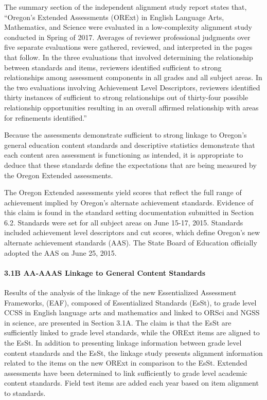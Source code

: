 \documentclass[]{article}
\let\oldparagraph\paragraph
\renewcommand{\paragraph}[1]{\oldparagraph{#1}\mbox{}}
\begin{document}
The summary section of the independent alignment study report states
that, ``Oregon's Extended Assessments (ORExt) in English Language Arts,
Mathematics, and Science were evaluated in a low-complexity alignment
study conducted in Spring of 2017. Averages of reviewer professional
judgments over five separate evaluations were gathered, reviewed, and
interpreted in the pages that follow. In the three evaluations that
involved determining the relationship between standards and items,
reviewers identified sufficient to strong relationships among assessment
components in all grades and all subject areas. In the two evaluations
involving Achievement Level Descriptors, reviewers identified thirty
instances of sufficient to strong relationships out of thirty-four
possible relationship opportunities resulting in an overall affirmed
relationship with areas for refinements identified.''

Because the assessments demonstrate sufficient to strong linkage to
Oregon's general education content standards and descriptive statistics
demonstrate that each content area assessment is functioning as
intended, it is appropriate to deduce that these standards define the
expectations that are being measured by the Oregon Extended assessments.

The Oregon Extended assessments yield scores that reflect the full range
of achievement implied by Oregon's alternate achievement standards.
Evidence of this claim is found in the standard setting documentation
submitted in Section 6.2. Standards were set for all subject areas on
June 15-17, 2015. Standards included achievement level descriptors and
cut scores, which define Oregon's new alternate achievement standards
(AAS). The State Board of Education officially adopted the AAS on June
25, 2015.

\hypertarget{b-aa-aaas-linkage-to-general-content-standards}{%
\paragraph{3.1B AA-AAAS Linkage to General Content
Standards}\label{b-aa-aaas-linkage-to-general-content-standards}}

Results of the analysis of the linkage of the new Essentialized
Assessment Frameworks, (EAF), composed of Essentialized Standards
(EsSt), to grade level CCSS in English language arts and mathematics and
linked to ORSci and NGSS in science, are presented in Section 3.1A. The
claim is that the EsSt are sufficiently linked to grade level standards,
while the ORExt items are aligned to the EsSt. In addition to presenting
linkage information between grade level content standards and the EsSt,
the linkage study presents alignment information related to the items on
the new ORExt in comparison to the EsSt. Extended assessments have been
determined to link sufficiently to grade level academic content
standards. Field test items are added each year based on item alignment
to standards.
\end{document}
